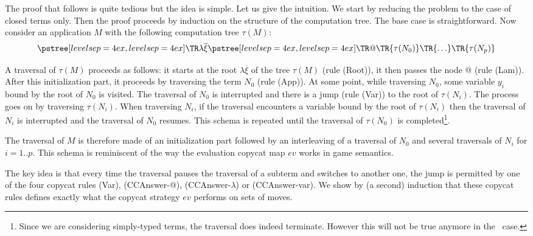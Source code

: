 \begin{rem} The proof that follows is quite tedious but the idea is simple. Let us give the intuition.
    We start by reducing the problem to the case of closed terms only. Then the proof proceeds by induction on the structure of the computation tree.
The base case is straightforward. Now consider an application $M$ with the following computation tree $\tau(M)$:
    $$ \tree[levelsep=4ex]{\lambda \overline{\xi}}
        { \tree[levelsep=4ex]{@}
            {   \TR{\tau(N_0)} \TR{\ldots} \TR{\tau(N_p)}}}
    $$

    A traversal of $\tau(M)$ proceeds as follows: it starts at the root $\lambda \overline{\xi}$ of the tree $\tau(M)$ (rule
    (Root)), it then passes the node @ (rule (Lam)).
    After this initialization part, it proceeds by traversing the term $N_0$ (rule (App)).
    At some point, while traversing $N_0$, some variable $y_i$ bound by the root of $N_0$ is visited. The traversal
    of $N_0$ is interrupted and there is a jump (rule (Var)) to the root of $\tau(N_i)$. The process goes on by traversing $\tau(N_i)$.
    When traversing $N_i$, if the traversal encounters a variable bound by the root of $\tau(N_i)$ then the traversal of $N_i$ is interrupted and
    the traversal of $N_0$ resumes.  This schema is repeated until the traversal of $\tau(N_0)$ is completed\footnote{Since we are considering
    simply-typed terms, the traversal does indeed terminate. However this will not be true anymore in the \pcf\ case.}.

    The traversal of $M$ is therefore made of an initialization part followed by an interleaving of a traversal of $N_0$ and
    several traversals of $N_i$ for $i=1..p$. This schema is reminiscent of the way the evaluation copycat map $ev$ works in game semantics.

    The key idea is that every time the traversal pauses the traversal of a subterm and switches to another one,
    the jump is permitted by one of the four copycat rules (Var), (CCAnswer-@), (CCAnswer-$\lambda$) or (CCAnswer-var).
    We show by (a second) induction that these copycat rules defines exactly what the copycat strategy $ev$ performs on sets of moves.


\end{rem}
